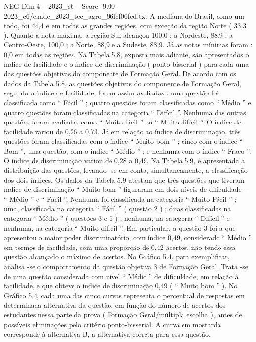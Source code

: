 \begin{textsample}{NEG Dim 4 – 2023\_c6 – Score -9.00 – 2023\_c6/enade\_2023\_tec\_agro\_96fcf06fcd.txt}
A mediana do Brasil, como um todo, foi 44,4 e em todas as grandes regiões, com exceção da região Norte ( 33,3 ).
Quanto à nota máxima, a região Sul alcançou 100,0 ; a Nordeste, 88,9 ; a Centro-Oeste, 100,0 ; a Norte, 88,9 e a Sudeste, 88,9.
Já as notas mínimas foram : 0,0 em todas as regiões.
Na Tabela 5.8, exposta mais adiante, são apresentados o índice de facilidade e o índice de discriminação ( ponto-bisserial ) para cada uma das questões objetivas do componente de Formação Geral.
De acordo com os dados da Tabela 5.8, as questões objetivas do componente de Formação Geral, segundo o índice de facilidade, foram assim avaliadas : uma questão foi classificada como “ Fácil ” ; quatro questões foram classificadas como “ Médio ” e quatro questões foram classificadas na categoria “ Difícil ”.
Nenhuma das outras questões foram avaliadas como “ Muito fácil ” ou “ Muito difícil ”.
O índice de facilidade variou de 0,26 a 0,73.
Já em relação ao índice de discriminação, três questões foram classificadas com o índice “ Muito bom ” ; cinco com o índice “ Bom ”, uma questão, com o índice “ Médio ” ; e nenhuma com o índice “ Fraco ”.
O índice de discriminação variou de 0,28 a 0,49.
Na Tabela 5.9, é apresentada a distribuição das questões, levando -se em conta, simultaneamente, a classificação dos dois índices.
Os dados da Tabela 5.9 atestam que três questões que tiveram índice de discriminação “ Muito bom ” figuraram em dois níveis de dificuldade – “ Médio ” e “ Fácil ”.
Nenhuma foi classificada na categoria “ Muito Fácil ” ; uma, classificada na categoria “ Fácil ” ( questão 2 ) ; duas classificadas na categoria “ Médio ” ( questões 3 e 6 ) ; nenhuma, na categoria “ Difícil ” e nenhuma, na categoria “ Muito difícil ”.
Em particular, a questão 3 foi a que apresentou o maior poder discriminatório, com índice 0,49, considerado “ Médio ” em termos de facilidade, com uma proporção de 0,42 acertos, não tendo essa questão alcançado o máximo de acertos.
No Gráfico 5.4, para exemplificar, analisa -se o comportamento da questão objetiva 3 de Formação Geral.
Trata -se de uma questão considerada com nível “ Médio ” de dificuldade, em relação à facilidade, e que obteve o índice de discriminação 0,49 ( “ Muito bom ” ).
No Gráfico 5.4, cada uma das cinco curvas representa o percentual de respostas em determinada alternativa da questão, em função do número de acertos dos estudantes nessa parte da prova ( Formação Geral/múltipla escolha ), antes de possíveis eliminações pelo critério ponto-bisserial.
A curva em mostarda corresponde à alternativa B, a alternativa correta para essa questão.

\end{textsample}
